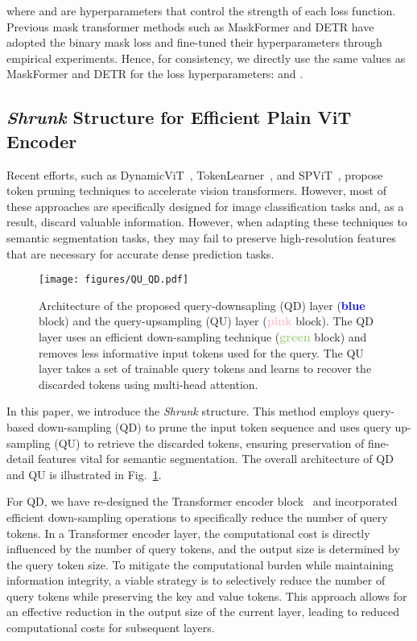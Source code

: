 where  and  are hyperparameters that control the strength of each loss function. Previous mask transformer methods such as MaskFormer \cite{maskformer} and DETR \cite{detr} have adopted the binary mask loss and fine-tuned their hyperparameters through empirical experiments. Hence, for consistency, we directly use the same values as MaskFormer and DETR for the loss hyperparameters:  and .


\subsection{ \emph{Shrunk} Structure for Efficient Plain ViT Encoder}
\label{sec:shrunk}
Recent efforts, such as DynamicViT~\cite{rao2021dynamicvit}, TokenLearner~\cite{ryoo2021tokenlearner}, and SPViT~\cite{kong2022spvit}, propose token pruning techniques to accelerate vision transformers. However, most of these approaches are specifically designed for image classification tasks and, as a result, discard valuable information. However, when adapting these techniques to semantic segmentation tasks, they may fail to preserve high-resolution features that are necessary for accurate dense prediction tasks.

\begin{figure}
    \centering
\texttt{[image: figures/QU\_QD.pdf]}
    \caption{Architecture of the proposed query-downsapling (QD) layer (\textbf{\textcolor{blue}{blue}} block) and the query-upsampling (QU) layer (\textbf{\textcolor{pink}{pink}} block). The QD layer uses an efficient down-sampling technique (\textbf{\textcolor[HTML]{A9D18E}{green}} block) and removes less informative input tokens used for the query.  The QU layer takes a set of trainable query tokens and learns to recover the discarded tokens using multi-head attention. }
    \label{fig:qu_qd}
\end{figure}
In this paper, we introduce the \emph{Shrunk} structure. This method employs query-based down-sampling (QD) to prune the input token sequence  and uses query up-sampling (QU) to retrieve the discarded tokens, ensuring preservation of fine-detail features vital for semantic segmentation.
The overall architecture of QD and QU is illustrated in Fig.~\ref{fig:qu_qd}. 

For QD, we have re-designed the Transformer encoder block~\cite{2017attention} and incorporated efficient down-sampling operations to specifically reduce the number of query tokens. In a Transformer encoder layer, the computational cost is directly influenced by the number of query tokens, and the output size is determined by the query token size. To mitigate the computational burden while maintaining information integrity, a viable strategy is to selectively reduce the number of query tokens while preserving the key and value tokens. This approach allows for an effective reduction in the output size of the current layer, leading to reduced computational costs for subsequent layers.


